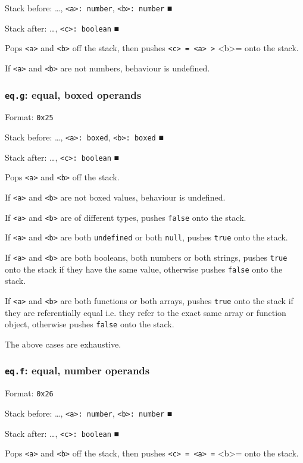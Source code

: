 \documentclass[11pt]{article}
\begin{document}
Stack before: \ldots{}​, \texttt{<a>: number}, \texttt{<b>: number} ■

Stack after: \ldots{}​, \texttt{<c>: boolean} ■

Pops \texttt{<a>} and \texttt{<b>} off the stack, then pushes \texttt{<c> = <a> >} <b>= onto
the stack.

If \texttt{<a>} and \texttt{<b>} are not numbers, behaviour is undefined.

\subsubsection{\texttt{eq.g}: equal, boxed operands}
\label{sec:orgb222de9}
Format: \texttt{0x25}

Stack before: \ldots{}​, \texttt{<a>: boxed}, \texttt{<b>: boxed} ■

Stack after: \ldots{}​, \texttt{<c>: boolean} ■

Pops \texttt{<a>} and \texttt{<b>} off the stack.

If \texttt{<a>} and \texttt{<b>} are not boxed values, behaviour is undefined.

If \texttt{<a>} and \texttt{<b>} are of different types, pushes \texttt{false} onto the
stack.

If \texttt{<a>} and \texttt{<b>} are both \texttt{undefined} or both \texttt{null}, pushes \texttt{true}
onto the stack.

If \texttt{<a>} and \texttt{<b>} are both booleans, both numbers or both strings,
pushes \texttt{true} onto the stack if they have the same value, otherwise
pushes \texttt{false} onto the stack.

If \texttt{<a>} and \texttt{<b>} are both functions or both arrays, pushes \texttt{true} onto
the stack if they are referentially equal i.e. they refer to the exact
same array or function object, otherwise pushes \texttt{false} onto the stack.

The above cases are exhaustive.

\subsubsection{\texttt{eq.f}: equal, number operands}
\label{sec:orge0a190c}
Format: \texttt{0x26}

Stack before: \ldots{}​, \texttt{<a>: number}, \texttt{<b>: number} ■

Stack after: \ldots{}​, \texttt{<c>: boolean} ■

Pops \texttt{<a>} and \texttt{<b>} off the stack, then pushes \texttt{<c> = <a> =} <b>= onto
the stack.
\end{document}
